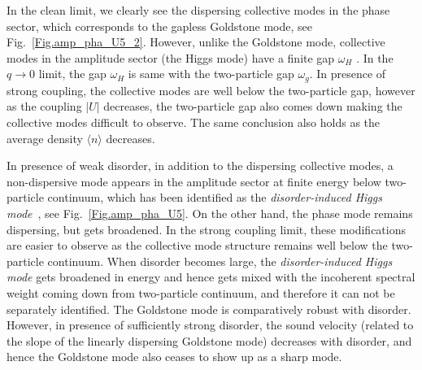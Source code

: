\documentclass[Colective.tex]{revtex4-1}
\begin{document}
In the clean limit, we clearly see the dispersing collective modes in the phase sector, which corresponds to the gapless Goldstone mode, see Fig.~\ref{Fig.amp_pha_U5_2}. However, unlike the Goldstone mode, collective modes in the amplitude sector (the Higgs mode) have a finite gap $\omega_{H}$ \cite{abhisek2020}. In the $q\rightarrow 0$ limit, the gap $\omega_{H}$ is same with the two-particle gap $\omega_g$. In presence of strong coupling, the collective modes are well below the two-particle gap, however as the coupling $|U|$ decreases, the two-particle gap also comes down making the collective modes difficult to observe. The same conclusion also holds as the average density $\langle n\rangle$ decreases.


In presence of weak disorder, in addition to the dispersing collective modes, a non-dispersive mode appears in the amplitude sector at finite energy below two-particle continuum, which has been identified as the \textit{disorder-induced Higgs mode}~\cite{abhisek2020}, see Fig.~\ref{Fig.amp_pha_U5}. On the other hand, the phase mode remains dispersing, but gets broadened. In the strong coupling limit, these modifications are easier to observe as the collective mode structure remains well below the two-particle continuum. When disorder becomes large, the \textit{disorder-induced Higgs mode} gets broadened in energy and hence gets mixed with the incoherent spectral weight coming down from two-particle continuum, and therefore it can not be separately identified. The Goldstone mode is comparatively robust with disorder. However, in presence of sufficiently strong disorder, the sound velocity (related to the slope of the linearly dispersing Goldstone mode) decreases with disorder, and hence the Goldstone mode also ceases to show up as a sharp mode.  
\end{document}
